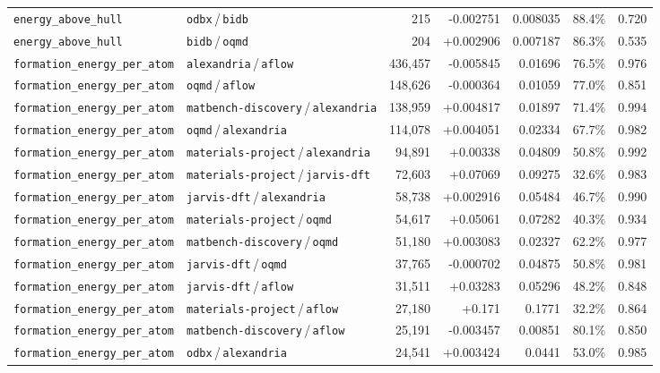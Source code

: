 \begin{longtable}{llrrrrr}
\texttt{energy\_above\_hull} & \texttt{odbx}\,/\,\texttt{bidb} & 215 & -0.002751 & 0.008035 & 88.4\% & 0.720 \\
\texttt{energy\_above\_hull} & \texttt{bidb}\,/\,\texttt{oqmd} & 204 & +0.002906 & 0.007187 & 86.3\% & 0.535 \\
\texttt{formation\_energy\_per\_atom} & \texttt{alexandria}\,/\,\texttt{aflow} & 436{,}457 & -0.005845 & 0.01696 & 76.5\% & 0.976 \\
\texttt{formation\_energy\_per\_atom} & \texttt{oqmd}\,/\,\texttt{aflow} & 148{,}626 & -0.000364 & 0.01059 & 77.0\% & 0.851 \\
\texttt{formation\_energy\_per\_atom} & \texttt{matbench-discovery}\,/\,\texttt{alexandria} & 138{,}959 & +0.004817 & 0.01897 & 71.4\% & 0.994 \\
\texttt{formation\_energy\_per\_atom} & \texttt{oqmd}\,/\,\texttt{alexandria} & 114{,}078 & +0.004051 & 0.02334 & 67.7\% & 0.982 \\
\texttt{formation\_energy\_per\_atom} & \texttt{materials-project}\,/\,\texttt{alexandria} & 94{,}891 & +0.00338 & 0.04809 & 50.8\% & 0.992 \\
\texttt{formation\_energy\_per\_atom} & \texttt{materials-project}\,/\,\texttt{jarvis-dft} & 72{,}603 & +0.07069 & 0.09275 & 32.6\% & 0.983 \\
\texttt{formation\_energy\_per\_atom} & \texttt{jarvis-dft}\,/\,\texttt{alexandria} & 58{,}738 & +0.002916 & 0.05484 & 46.7\% & 0.990 \\
\texttt{formation\_energy\_per\_atom} & \texttt{materials-project}\,/\,\texttt{oqmd} & 54{,}617 & +0.05061 & 0.07282 & 40.3\% & 0.934 \\
\texttt{formation\_energy\_per\_atom} & \texttt{matbench-discovery}\,/\,\texttt{oqmd} & 51{,}180 & +0.003083 & 0.02327 & 62.2\% & 0.977 \\
\texttt{formation\_energy\_per\_atom} & \texttt{jarvis-dft}\,/\,\texttt{oqmd} & 37{,}765 & -0.000702 & 0.04875 & 50.8\% & 0.981 \\
\texttt{formation\_energy\_per\_atom} & \texttt{jarvis-dft}\,/\,\texttt{aflow} & 31{,}511 & +0.03283 & 0.05296 & 48.2\% & 0.848 \\
\texttt{formation\_energy\_per\_atom} & \texttt{materials-project}\,/\,\texttt{aflow} & 27{,}180 & +0.171 & 0.1771 & 32.2\% & 0.864 \\
\texttt{formation\_energy\_per\_atom} & \texttt{matbench-discovery}\,/\,\texttt{aflow} & 25{,}191 & -0.003457 & 0.00851 & 80.1\% & 0.850 \\
\texttt{formation\_energy\_per\_atom} & \texttt{odbx}\,/\,\texttt{alexandria} & 24{,}541 & +0.003424 & 0.0441 & 53.0\% & 0.985 \\

\end{longtable}
